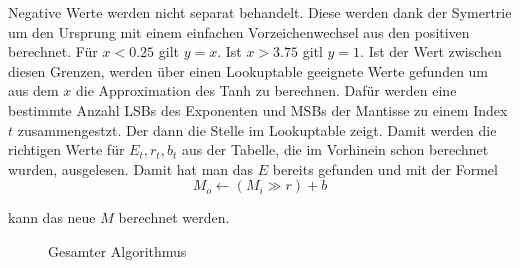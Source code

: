 Negative Werte werden nicht separat behandelt. Diese werden dank der Symertrie um den Ursprung mit einem einfachen Vorzeichenwechsel aus den positiven berechnet.
Für $x < 0.25$ gilt $y = x$.
Ist $x > 3.75$ gitl $y = 1$.
Ist der Wert zwischen diesen Grenzen, werden über einen Lookuptable geeignete Werte gefunden um aus dem $x$ die Approximation des Tanh zu berechnen.
Dafür werden eine bestimmte Anzahl LSBs des Exponenten und MSBs der Mantisse zu einem Index $t$ zusammengestzt. Der dann die Stelle im Lookuptable zeigt.
Damit werden die richtigen Werte für $E_{t}, r_{t}, b_{t}$ aus der Tabelle, die im Vorhinein schon berechnet wurden, ausgelesen.
Damit hat man das $E$ bereits gefunden und mit der Formel
\[
    M_{o} \leftarrow\left(M_{i} \gg r\right)+b
\]

kann das neue $M$ berechnet werden.

\begin{figure}
\centering
{}
\caption{Gesamter Algorithmus
\label{motivation:figure:gesalgo}}
\end{figure}


